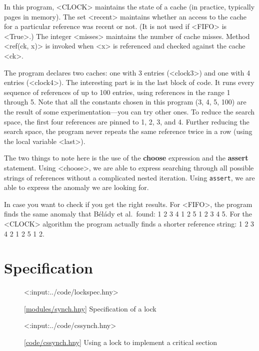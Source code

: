 \documentclass{report}
\newcommand{\harmonylink}[1]{%
[\href{https://harmony.cs.cornell.edu/#1}{\underline{#1}}]%
}
\newenvironment{code}{
\tcolorbox
}{
\endtcolorbox
}
\begin{document}
In this program, <{CLOCK}> maintains the state of a cache
(in practice, typically pages in memory).
The set <{recent}> maintains whether an access to the cache
for a particular reference was recent or not.
(It is not used if <{FIFO}> is <{True}>.)
The integer <{misses}> maintains the number of cache misses.
Method <{ref(ck, x)}> is invoked when <{x}> is
referenced and checked against the cache <{ck}>.

The program declares two caches: one with 3 entries (<{clock3}>)
and one with 4 entries (<{clock4}>).
The interesting part is in the last block of code.
It runs every sequence of references of up to 100 entries, using
references in the range 1 through 5.
Note that all the constants chosen in this program (3, 4, 5, 100)
are the result of some experimentation---you can try other ones.
To reduce the search space, the first four references are pinned
to 1, 2, 3, and 4.
Further reducing the search space, the program never repeats the
same reference twice in a row (using the local variable <{last}>).

The two things to note here is the use of the \textbf{choose}
expression and the \textbf{assert} statement.  Using <{choose}>,
we are able to express searching through all possible strings of
references without a complicated nested iteration.
Using \texttt{assert}, we are able to express the anomaly we are
looking for.

In case you want to check if you get the right results.  For <{FIFO}>,
the program finds the same anomaly that
B\'{e}l\'{a}dy et al.~found: 1 2 3 4 1 2 5 1 2 3 4 5.
For the <{CLOCK}> algorithm the program actually finds a shorter
reference string: 1 2 3 4 2 1 2 5 1 2.

\chapter{Specification}
\label{ch:specification}

\begin{figure}
\begin{code}
<{:input:../code/lockspec.hny}>
\end{code}
\caption{\harmonylink{modules/synch.hny} Specification of a lock}
\label{fig:lockspec}
\end{figure}

\begin{figure}
\begin{code}
<{:input:../code/cssynch.hny}>
\end{code}
\caption{\harmonylink{code/cssynch.hny} Using a lock to implement a
critical section}
\label{fig:cssynch}
\end{figure}
\end{document}
